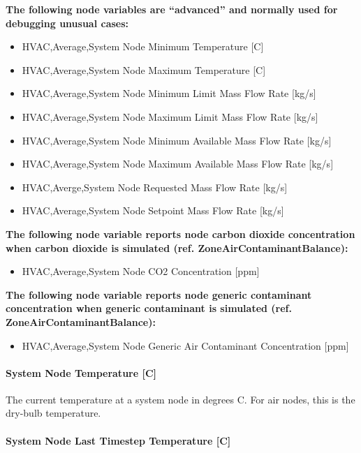 \textbf{The following node variables are ``advanced'' and normally used for debugging unusual cases:}

\begin{itemize}
\item
  HVAC,Average,System Node Minimum Temperature {[}C{]}
\item
  HVAC,Average,System Node Maximum Temperature {[}C{]}
\item
  HVAC,Average,System Node Minimum Limit Mass Flow Rate {[}kg/s{]}
\item
  HVAC,Average,System Node Maximum Limit Mass Flow Rate {[}kg/s{]}
\item
  HVAC,Average,System Node Minimum Available Mass Flow Rate {[}kg/s{]}
\item
  HVAC,Average,System Node Maximum Available Mass Flow Rate {[}kg/s{]}
\item
  HVAC,Averge,System Node Requested Mass Flow Rate {[}kg/s{]}
\item
  HVAC,Average,System Node Setpoint Mass Flow Rate {[}kg/s{]}
\end{itemize}

\textbf{The following node variable reports node carbon dioxide concentration when carbon dioxide is simulated (ref. ZoneAirContaminantBalance):}

\begin{itemize}
\tightlist
\item
  HVAC,Average,System Node CO2 Concentration {[}ppm{]}
\end{itemize}

\textbf{The following node variable reports node generic contaminant concentration when generic contaminant is simulated (ref. ZoneAirContaminantBalance):}

\begin{itemize}
\tightlist
\item
  HVAC,Average,System Node Generic Air Contaminant Concentration {[}ppm{]}
\end{itemize}

\paragraph{System Node Temperature {[}C{]}}\label{system-node-temperature-c-000}

The current temperature at a system node in degrees C. For air nodes, this is the dry-bulb temperature.

\paragraph{System Node Last Timestep Temperature {[}C{]}}\label{system-node-last-timestep-temperature-c}

